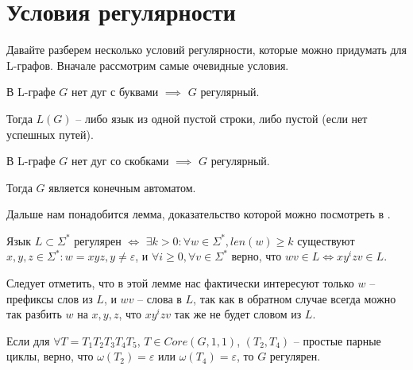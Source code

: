 \section{Условия регулярности}

Давайте разберем несколько условий регулярности, которые можно придумать для L-графов.
Вначале рассмотрим самые очевидные условия.

\begin{theorem}
    \label{condition_no_letters}
    В L-графе $G$ нет дуг с буквами $\implies$ $G$ регулярный. 
\end{theorem}
Тогда $L(G)$ -- либо язык из одной пустой строки, либо пустой (если нет успешных путей).


\begin{theorem}
    \label{condition_no_brackets}
    В L-графе $G$ нет дуг со скобками $\implies$ $G$ регулярный.
\end{theorem}
Тогда $G$ является конечным автоматом.

Дальше нам понадобится лемма, доказательство которой можно посмотреть в \cite{handbook_of_formal}.

\begin{lemma}
    \label{pumping_lemma_4_3}
    Язык $L \subset \Sigma^*$ регулярен $\iff$ $\exists k > 0: \forall w \in \Sigma^*, len(w) \geq k$ 
    существуют $x,y,z \in \Sigma^*: w=xyz, y \neq \varepsilon$,
    и $\forall i \geq 0, \forall v \in \Sigma^*$ верно, что $wv \in L \iff xy^izv \in L$. 
\end{lemma}

Следует отметить, что в этой лемме нас фактически интересуют только $w$ -- префиксы слов из $L$, и $wv$ -- слова в $L$, 
так как в обратном случае всегда можно так разбить $w$ на $x,y,z$, что $xy^izv$ так же не будет словом из $L$.  

\begin{theorem}
    \label{condition_one_sided_loops}
    Если для $\forall T = T_1 T_2 T_3 T_4 T_5$, $T \in Core(G, 1, 1)$, $(T_2, T_4)$ -- простые парные циклы, 
    верно, что $\omega(T_2) = \varepsilon$ или $\omega(T_4) = \varepsilon$,
    то $G$ регулярен.
\end{theorem}

